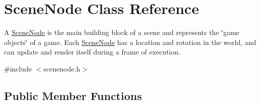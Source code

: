 \hypertarget{class_scene_node}{}\section{Scene\+Node Class Reference}
\label{class_scene_node}


A \hyperlink{class_scene_node}{Scene\+Node} is the main building block of a scene and represents the \char`\"{}game objects\char`\"{} of a game. Each \hyperlink{class_scene_node}{Scene\+Node} has a location and rotation in the world, and can update and render itself during a frame of execution.  




{\ttfamily \#include $<$scenenode.\+h$>$}

\subsection*{Public Member Functions}
